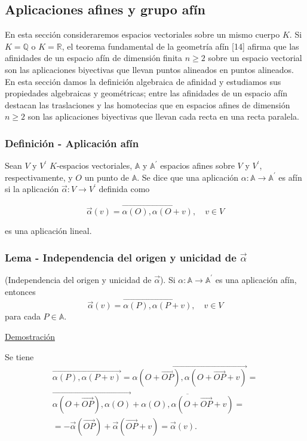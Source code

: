 \documentclass[12pt, a4paper, ones, notitlepage, openany,titlepage]{article}
\newcommand{\demostracion}{\noindent\underline{Demostración}}
\begin{document}
\subsection{Aplicaciones afines y grupo afín}
En esta sección consideraremos espacios vectoriales sobre un mismo cuerpo $K$. Si $K=\mathbb{Q}$ o $K=\mathbb{R}$, el teorema fundamental de la geometría afín [14] afirma que las afinidades de un espacio afín de dimensión finita $n \geq 2$ sobre un espacio vectorial son las aplicaciones biyectivas que llevan puntos alineados en puntos alineados. En esta sección damos la definición algebraica de afinidad y estudiamos sus propiedades algebraicas y geométricas; entre las afinidades de un espacio afín destacan las traslaciones y las homotecias que en espacios afines de dimensión $n \geq 2$ son las aplicaciones biyectivas que llevan cada recta en una recta paralela.

\subsubsection{Definición - Aplicación afín}
Sean $V$ y $V^{\prime}$ $K$-espacios vectoriales, $\mathbb{A}$ y $\mathbb{A}^{\prime}$ espacios afines sobre $V$ y $V^{\prime}$, respectivamente, y $O$ un punto de $\mathbb{A}$. Se dice que una aplicación $\alpha: \mathbb{A} \rightarrow \mathbb{A}^{\prime}$ es afín si la aplicación $\overrightarrow{\alpha}: V \rightarrow V^{\prime}$ definida como

$$
\overrightarrow{\alpha}(v)=\overrightarrow{\alpha(O), \alpha(O+v)}, \quad v \in V
$$

\noindent es una aplicación lineal.

\subsubsection{Lema - Independencia del origen y unicidad de $\overrightarrow{\alpha}$}
\noindent (Independencia del origen y unicidad de $\overrightarrow{\alpha}$). Si $\alpha: \mathbb{A} \rightarrow \mathbb{A}^{\prime}$ es una aplicación afín, entonces
$$
\overrightarrow{\alpha}(v)=\overrightarrow{\alpha(P), \alpha(P+v)}, \quad v \in V
$$
para cada $P \in \mathbb{A}$.

\demostracion

\noindent Se tiene
\begin{gather*}
\overrightarrow{\alpha(P), \alpha(P+v)} =\overrightarrow{\alpha(O+\overrightarrow{O P}), \alpha(O+\overrightarrow{O P}+v)}=\\\overrightarrow{\alpha(O+\overrightarrow{O P}), \alpha(O)}+\overline{\alpha(O), \alpha(O+\overrightarrow{O P}+v)} = \\ =-\overrightarrow{\alpha}(\overrightarrow{O P})+\overrightarrow{\alpha}(\overrightarrow{O P}+v)=\overrightarrow{\alpha}(v).
\end{gather*}
\end{document}
